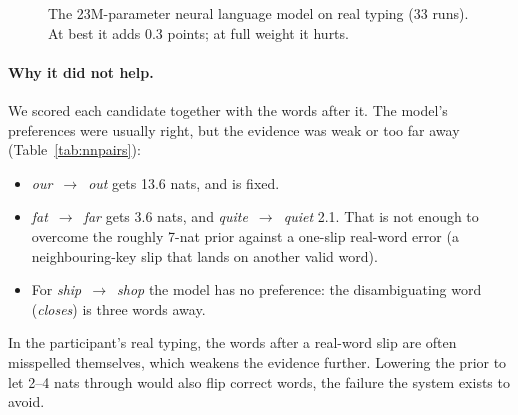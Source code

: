 \documentclass[11pt,a4paper]{article}
\begin{document}
\begin{figure}[t]
\centering
{}
\caption{The 23M-parameter neural language model on real typing (33 runs). At best it adds 0.3 points; at full weight it hurts.}
\label{fig:nn}
\end{figure}

\paragraph{Why it did not help.} We scored each candidate together with the words after it. The model's preferences were usually right, but the evidence was weak or too far away (Table~\ref{tab:nnpairs}):
\begin{itemize}
\item \emph{our}~$\to$~\emph{out} gets 13.6 nats, and is fixed.
\item \emph{fat}~$\to$~\emph{far} gets 3.6 nats, and \emph{quite}~$\to$~\emph{quiet} 2.1. That is not enough to overcome the roughly 7-nat prior against a one-slip real-word error (a neighbouring-key slip that lands on another valid word).
\item For \emph{ship}~$\to$~\emph{shop} the model has no preference: the disambiguating word (\emph{closes}) is three words away.
\end{itemize}
In the participant's real typing, the words after a real-word slip are often misspelled themselves, which weakens the evidence further. Lowering the prior to let 2--4 nats through would also flip correct words, the failure the system exists to avoid.
\end{document}
